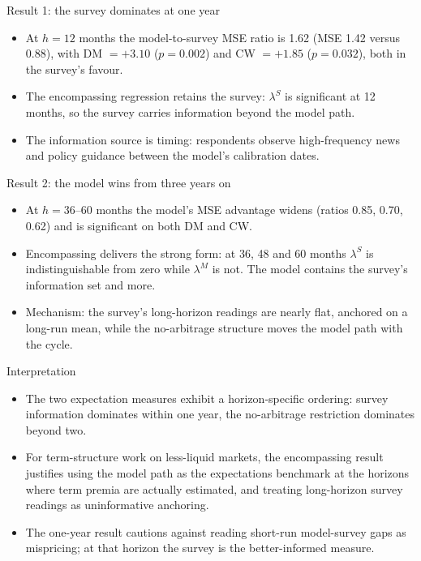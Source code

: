 \documentclass[aspectratio=169,11pt]{beamer}
\begin{document}
\begin{frame}{Result 1: the survey dominates at one year}
  \begin{itemize}
    \item At $h=12$ months the model-to-survey MSE ratio is 1.62
          (MSE 1.42 versus 0.88), with DM $=+3.10$ ($p=0.002$) and CW
          $=+1.85$ ($p=0.032$), both in the survey's favour.
    \item The encompassing regression retains the survey:
          $\lambda^{S}$ is significant at 12 months, so the survey carries
          information beyond the model path.
    \item The information source is timing: respondents observe
          high-frequency news and policy guidance between the model's
          calibration dates.
  \end{itemize}
\end{frame}

\begin{frame}{Result 2: the model wins from three years on}
  \begin{itemize}
    \item At $h=36$--$60$ months the model's MSE advantage widens (ratios
          0.85, 0.70, 0.62) and is significant on both DM and CW.
    \item Encompassing delivers the strong form: at 36, 48 and 60 months
          $\lambda^{S}$ is indistinguishable from zero while $\lambda^{M}$ is
          not. The model contains the survey's information set and more.
    \item Mechanism: the survey's long-horizon readings are nearly flat,
          anchored on a long-run mean, while the no-arbitrage structure moves
          the model path with the cycle.
  \end{itemize}
\end{frame}

\begin{frame}{Interpretation}
  \small
  \begin{itemize}
    \item The two expectation measures exhibit a horizon-specific ordering:
          survey information dominates within one year, the no-arbitrage
          restriction dominates beyond two.
    \item For term-structure work on less-liquid markets, the encompassing
          result justifies using the model path as the expectations benchmark
          at the horizons where term premia are actually estimated, and
          treating long-horizon survey readings as uninformative anchoring.
    \item The one-year result cautions against reading short-run model-survey
          gaps as mispricing; at that horizon the survey is the better-informed
          measure.
  \end{itemize}
\end{frame}
\end{document}
